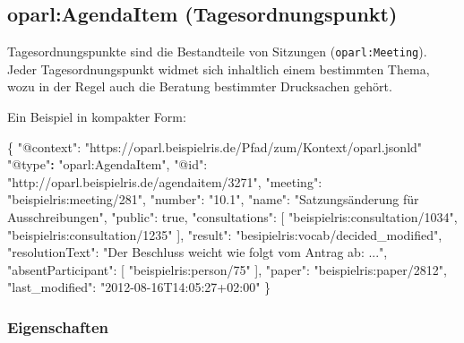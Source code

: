 \documentclass[,a4paper]{article}
\newenvironment{Shaded}{}{}
\newcommand{\DataTypeTok}[1]{\textcolor[rgb]{0.56,0.13,0.00}{{#1}}}
\newcommand{\DecValTok}[1]{\textcolor[rgb]{0.25,0.63,0.44}{{#1}}}
\newcommand{\StringTok}[1]{\textcolor[rgb]{0.25,0.44,0.63}{{#1}}}
\newcommand{\ErrorTok}[1]{\textcolor[rgb]{1.00,0.00,0.00}{\textbf{{#1}}}}
\newcommand{\NormalTok}[1]{{#1}}
\begin{document}
\subsection{oparl:AgendaItem
(Tagesordnungspunkt)}\label{oparlux5fagendaitem}

Tagesordnungspunkte sind die Bestandteile von Sitzungen
(\texttt{oparl:Meeting}). Jeder Tagesordnungspunkt widmet sich
inhaltlich einem bestimmten Thema, wozu in der Regel auch die Beratung
bestimmter Drucksachen gehört.

Ein Beispiel in kompakter Form:

\begin{Shaded}
\begin{Highlighting}[]
\NormalTok{\{}
    \DataTypeTok{"@context"}\NormalTok{: }\StringTok{"https://oparl.beispielris.de/Pfad/zum/Kontext/oparl.jsonld"}
    \StringTok{"@type"}\ErrorTok{:} \StringTok{"oparl:AgendaItem"}\NormalTok{,}
    \DataTypeTok{"@id"}\NormalTok{: }\StringTok{"http://oparl.beispielris.de/agendaitem/3271"}\NormalTok{,}
    \DataTypeTok{"meeting"}\NormalTok{: }\StringTok{"beispielris:meeting/281"}\NormalTok{,}
    \DataTypeTok{"number"}\NormalTok{: }\StringTok{"10.1"}\NormalTok{,}
    \DataTypeTok{"name"}\NormalTok{: }\StringTok{"Satzungsänderung für Ausschreibungen"}\NormalTok{,}
    \DataTypeTok{"public"}\NormalTok{: }\DecValTok{true}\NormalTok{,}
    \DataTypeTok{"consultations"}\NormalTok{: [}
        \StringTok{"beispielris:consultation/1034"}\NormalTok{,}
        \StringTok{"beispielris:consultation/1235"}
    \NormalTok{],}
    \DataTypeTok{"result"}\NormalTok{: }\StringTok{"besipielris:vocab/decided_modified"}\NormalTok{,}
    \DataTypeTok{"resolutionText"}\NormalTok{: }\StringTok{"Der Beschluss weicht wie folgt vom Antrag ab: ..."}\NormalTok{,}
    \DataTypeTok{"absentParticipant"}\NormalTok{: [}
        \StringTok{"beispielris:person/75"}
    \NormalTok{],}
    \DataTypeTok{"paper"}\NormalTok{: }\StringTok{"beispielris:paper/2812"}\NormalTok{,}
    \DataTypeTok{"last_modified"}\NormalTok{: }\StringTok{"2012-08-16T14:05:27+02:00"}
\NormalTok{\}}
\end{Highlighting}
\end{Shaded}

\subsubsection{Eigenschaften}\label{eigenschaften-5}
\end{document}
